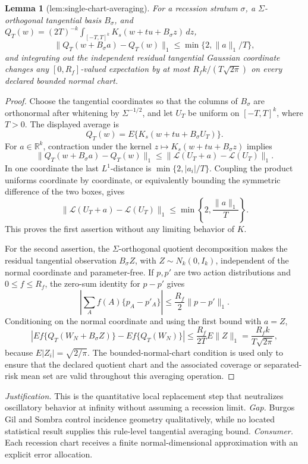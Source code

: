 \documentclass{article}
\newtheorem{lemma}{Lemma}
\begin{document}
\begin{lemma}[lem:single-chart-averaging]\label{lem:single-chart-averaging}
For a recession stratum \(\sigma\), a \(\Sigma\)-orthogonal tangential basis \(B_{\sigma}\), and \(Q_T(w)=(2T)^{-k}\int_{[-T,T]^k}K_s(w+t u+B_{\sigma}z)\,dz\), \[\|Q_T(w+B_{\sigma}a)-Q_T(w)\|_1\le\min\{2,\|a\|_1/T\},\] and integrating out the independent residual tangential Gaussian coordinate changes any \([0,R_f]\)-valued expectation by at most \(R_fk/(T\sqrt{2\pi})\) on every declared bounded normal chart.
\end{lemma}
\begin{proof}
Choose the tangential coordinates so that the columns of \(B_\sigma\) are orthonormal after whitening by \(\Sigma^{-1/2}\), and let \(U_T\) be uniform on \([-T,T]^k\), where \(T>0\). The displayed average is
\[
 Q_T(w)=E\{K_s(w+t u+B_\sigma U_T)\}.
\]
For \(a\in\mathbb R^k\), contraction under the kernel \(z\mapsto K_s(w+t u+B_\sigma z)\) implies
\[
 \|Q_T(w+B_\sigma a)-Q_T(w)\|_1
 \le \|\mathcal L(U_T+a)-\mathcal L(U_T)\|_1.
\]
In one coordinate the last \(L^1\)-distance is \(\min\{2,|a_i|/T\}\). Coupling the product uniforms coordinate by coordinate, or equivalently bounding the symmetric difference of the two boxes, gives
\[
 \|\mathcal L(U_T+a)-\mathcal L(U_T)\|_1
 \le \min\left\{2,\frac{\|a\|_1}{T}\right\}.
\]
This proves the first assertion without any limiting behavior of \(K\).

For the second assertion, the \(\Sigma\)-orthogonal quotient decomposition makes the residual tangential observation \(B_\sigma Z\), with \(Z\sim N_k(0,I_k)\), independent of the normal coordinate and parameter-free. If \(p,p'\) are two action distributions and \(0\le f\le R_f\), the zero-sum identity for \(p-p'\) gives
\[
 \left|\sum_A f(A)\{p_A-p'_A\}\right|
 \le \frac{R_f}{2}\|p-p'\|_1.
\]
Conditioning on the normal coordinate and using the first bound with \(a=Z\),
\[
 \left|E f\{Q_T(W_N+B_\sigma Z)\}-E f\{Q_T(W_N)\}\right|
 \le \frac{R_f}{2T}E\|Z\|_1
 =\frac{R_fk}{T\sqrt{2\pi}},
\]
because \(E|Z_i|=\sqrt{2/\pi}\). The bounded-normal-chart condition is used only to ensure that the declared quotient chart and the associated coverage or separated-risk mean set are valid throughout this averaging operation.
\end{proof}
\par\smallskip\noindent \textit{Justification.} This is the quantitative local replacement step that neutralizes oscillatory behavior at infinity without assuming a recession limit. \textit{Gap.} Burgos Gil and Sombra control incidence geometry qualitatively, while no located statistical result supplies this rule-level tangential averaging bound. \textit{Consumer.} Each recession chart receives a finite normal-dimensional approximation with an explicit error allocation.
\end{document}
